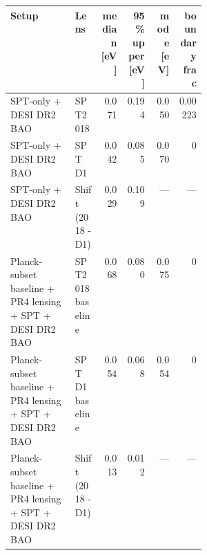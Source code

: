 \begin{tabular}{p{0.33\linewidth} l r r r r}
\toprule
Setup & Lens & median [eV] & 95\% upper [eV] & mode [eV] & boundary frac \\
\midrule
SPT-only + DESI DR2 BAO & SPT2018 & 0.071 & 0.194 & 0.050 & 0.00223 \\
SPT-only + DESI DR2 BAO & SPT D1 & 0.042 & 0.085 & 0.070 & 0 \\
SPT-only + DESI DR2 BAO & Shift (2018 - D1) & 0.029 & 0.109 & --- & --- \\
Planck-subset baseline + PR4 lensing + SPT + DESI DR2 BAO & SPT2018 baseline & 0.068 & 0.080 & 0.075 & 0 \\
Planck-subset baseline + PR4 lensing + SPT + DESI DR2 BAO & SPT D1 baseline & 0.054 & 0.068 & 0.054 & 0 \\
Planck-subset baseline + PR4 lensing + SPT + DESI DR2 BAO & Shift (2018 - D1) & 0.013 & 0.012 & --- & --- \\
\bottomrule
\end{tabular}
